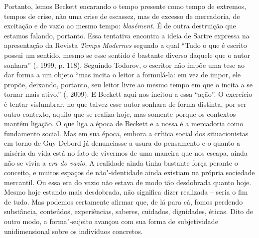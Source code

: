 {Portanto, lemos Beckett encarando o tempo presente como tempo de
extremos, tempos de crise, não uma crise de escassez, mas de excesso de
mercadoria, de excitação e de vazio ao mesmo tempo: \emph{blasément.} É
de outra destruição que estamos falando, portanto. Essa tentativa
encontra a ideia de Sartre expressa na apresentação da Revista
\emph{Temps} \emph{Modernes} segundo a qual ``Tudo o que é escrito
possui um sentido, mesmo se esse sentido é bastante diverso daquele que
o autor sonhara'' (, 1999, p. 118). Seguindo Todorov, o escritor
não impõe uma tese ao dar forma a um objeto ``mas incita o leitor a
formulá-la: em vez de impor, ele propõe, deixando, portanto, seu leitor
livre ao mesmo tempo em que o incita a se tornar mais ativo.'' (,
2009). E Beckett aqui nos incitou a essa ``ação''. O exercício é tentar
vislumbrar, no que talvez esse autor sonhara de forma distinta, por ser
outro contexto, aquilo que se realiza hoje, mas somente porque os
contextos mantêm ligação. O que liga a época de Beckett e a nossa é a
mercadoria como fundamento social. Mas em sua época, embora a crítica
social dos situacionistas em torno de Guy Debord já denunciasse a usura
do pensamento e o quanto a miséria da vida está no fato de vivermos de
uma maneira que nos escapa, ainda não se vivia a \emph{era do vazio}. A
realidade ainda tinha bastante força perante o conceito, e muitos
espaços de não"-identidade ainda existiam na própria sociedade mercantil.
Ou essa era do vazio não estava de modo tão desdobrada quanto hoje.
Mesmo hoje estando mais desdobrada, não significa dizer realizada --
seria o fim de tudo. Mas podemos certamente afirmar que, de lá para cá,
fomos perdendo substância, conteúdos, experiências, saberes, cuidados,
dignidades, éticas. Dito de outro modo, a forma"-sujeito avançou com sua
forma de subjetividade unidimensional sobre os indivíduos concretos.

}

